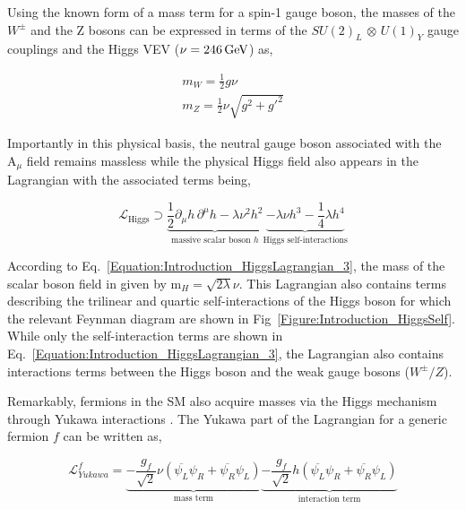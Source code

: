 Using the known form of a mass term for a spin-1 gauge boson, the masses of the $W^\pm$ and the Z bosons can be expressed in terms of the $SU(2)_{L}$ $\otimes$ $U(1)_{Y}$ gauge couplings and the Higgs VEV ($\nu = 246 \,\text{Ge\hspace{-.08em}V}$) as,

\begin{equation}
\begin{array}{c}
    m_W = \frac{1}{2}g\nu \\
    m_Z = \frac{1}{2}\nu\sqrt{g^2+g'^2}
\end{array}
\end{equation}

Importantly in this physical basis, the neutral gauge boson associated with the $\text{A}_\mu$ field remains massless while the physical Higgs field also appears in the Lagrangian with the associated terms being,

\begin{equation}
    \mathcal{L}_{\text{Higgs}} \supset \underbrace{\frac{1}{2} \partial_\mu h \, \partial^\mu h - \lambda \nu^2 h^2}_{\text{massive scalar boson } h}
    \underbrace{- \lambda \nu h^3 - \frac{1}{4} \lambda h^4}_{\text{Higgs self-interactions}}
\label{Equation:Introduction_HiggsLagrangian_3}
\end{equation}

According to Eq.~\ref{Equation:Introduction_HiggsLagrangian_3}, the mass of the scalar boson field in given by $\text{m}_H = \sqrt{2\lambda}\nu$. This Lagrangian also contains terms describing the trilinear and quartic self-interactions of the Higgs boson for which the relevant Feynman diagram are shown in Fig~\ref{Figure:Introduction_HiggsSelf}. While only the self-interaction terms are shown in Eq.~\ref{Equation:Introduction_HiggsLagrangian_3}, the Lagrangian also contains interactions terms between the Higgs boson and the weak gauge bosons ($W^\pm/Z$). 

Remarkably, fermions in the SM also acquire masses via the Higgs mechanism through Yukawa interactions \cite{YukawaInteractions}. The Yukawa part of the Lagrangian for a generic fermion $f$ can be written as,


\begin{equation}
    \mathcal{L}_{Yukawa}^f = \underbrace{-\frac{g_f}{\sqrt{2}}\nu(\overline{\psi_L}\psi_R + \overline{\psi_R} \psi_L)}_{\text{mass term}} \underbrace{- \frac{g_f}{\sqrt{2}}h(\overline{\psi_L}\psi_R + \overline{\psi_R} \psi_L)}_{\text{interaction term}}
\end{equation}

